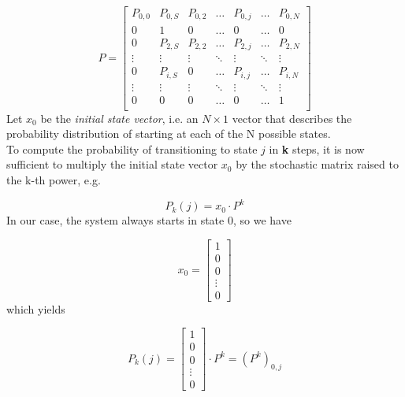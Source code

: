 \begin{equation*}
P = 
\begin{bmatrix}
P_{0,0}	& P_{0,S}	& P_{0,2}	& \dots  	& P_{0,j}	& \dots		& P_{0,N} \\
0		& 1			& 0			& \dots  	& 0			& \dots		& 0		 \\
0		& P_{2,S}	& P_{2,2}	& \dots  	& P_{2,j}	& \dots		& P_{2,N} \\
\vdots	& \vdots	& \vdots	& \ddots 	& \vdots	& \ddots	& \vdots \\
0		& P_{i,S}	& 0			& \dots		& P_{i,j}	& \dots		& P_{i,N} \\
\vdots	& \vdots	& \vdots	& \ddots	& \vdots	& \ddots	& \vdots \\
0		& 0			& 0			& \dots  	& 0			& \dots		& 1		 \\
\end{bmatrix}
\label{stochasticMatrix2}
\end{equation*}
\hfill \break
Let $x_{0}$ be the \textit{initial state vector}, i.e. an $N \times 1$ vector that describes the probability distribution of starting at each of the N possible states.\\
To compute the probability of transitioning to state $j$ in \textbf{k} steps, it is now sufficient to multiply the initial state vector $x_{0}$ by the stochastic matrix raised to the k-th power, e.g.

\begin{equation}\label{probAtStateK1}
P_{k}(j) = x_{0}\cdot P^{k}
\end{equation}
\hfill \break
In our case, the system always starts in state 0, so we have

\begin{equation*}
x_{0} = 
\begin{bmatrix}
1 \\
0 \\
0 \\
\vdots \\
0
\end{bmatrix}
\label{initialStateVector}
\end{equation*}
\hfill \break
which yields

\begin{equation}
P_{k}(j) = 
\begin{bmatrix}
1 \\
0 \\
0 \\
\vdots \\
0
\end{bmatrix}
\cdot P^{k} = (P^{k})_{0,j}
\label{transProb}
\end{equation}
